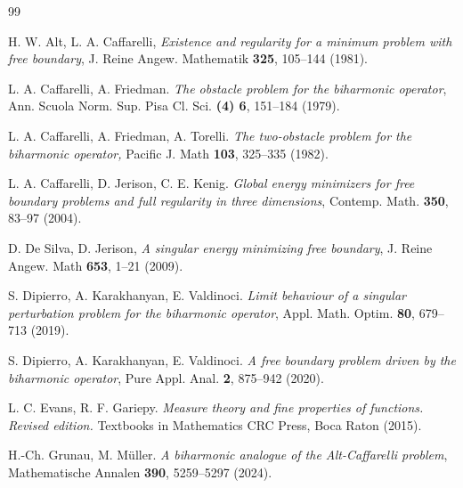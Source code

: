 \documentclass[twoside,11pt]{article}
\theoremstyle{definition}
\begin{document}







\begin{thebibliography}{99}
	
	
	 H. W. Alt, L. A. Caffarelli, \emph{Existence and regularity for a minimum problem with free boundary}, J. Reine Angew. Mathematik {\bf 325}, 105--144 (1981).
	
 L. A. Caffarelli, A. Friedman. \emph{The obstacle problem for the biharmonic operator},  Ann. Scuola Norm. Sup. Pisa Cl. Sci. {\bfseries (4) 6}, 151--184 (1979).

 L. A. Caffarelli, A. Friedman, A. Torelli. \emph{The two-obstacle problem for the biharmonic operator,} Pacific J. Math {\bfseries 103}, 325--335 (1982). 


 L. A. Caffarelli, D. Jerison,  C. E. Kenig. \emph{Global energy minimizers for free boundary problems and full regularity in three dimensions}, Contemp. Math. {\bfseries 350}, 83--97 (2004).



 D. De Silva, D. Jerison, \emph{A singular energy minimizing free boundary}, J. Reine Angew. Math {\bfseries 653}, 1--21 (2009).

S. Dipierro, A. Karakhanyan, E. Valdinoci. \emph{Limit behaviour of a singular perturbation problem for the
	biharmonic operator}, Appl. Math. Optim. {\bfseries 80}, 679--713 (2019).



S. Dipierro, A. Karakhanyan, E. Valdinoci. \emph{A free boundary problem driven by the biharmonic operator}, Pure Appl. Anal. {\bfseries 2}, 875--942 (2020).

 L. C. Evans, R. F. Gariepy. \emph{Measure theory and fine properties of functions. Revised edition.} Textbooks in Mathematics CRC Press, Boca Raton (2015).
	
 H.-Ch. Grunau, M. Müller. \emph{A biharmonic analogue of the Alt-Caffarelli problem}, Mathematische Annalen {\bfseries 390}, 5259--5297   (2024).



\end{thebibliography}
\end{document}
